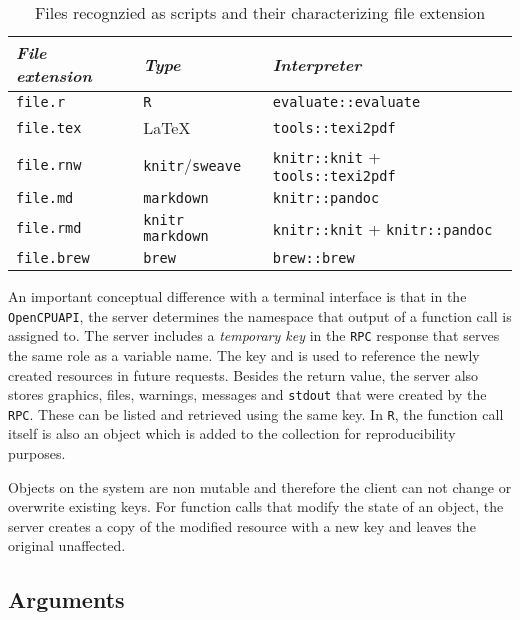 \documentclass{article}
\newcommand{\R}{\texttt{R}\xspace}
\newcommand{\API}{\texttt{API}\xspace}
\newcommand{\RPC}{\texttt{RPC}\xspace}
\newcommand{\OpenCPU}{\texttt{OpenCPU}\xspace}
\newcommand{\Latex}{\LaTeX \xspace}
\begin{document}
\begin{table}[H]
\centering
\def\arraystretch{1.3}%
\begin{tabular}{@{}lll@{}}
\toprule
\emph{File extension} & \emph{Type}           & \emph{Interpreter}                   \\ \midrule
\texttt{file.r}         & \R       & \texttt{evaluate::evaluate}            \\
\texttt{file.tex}       & \Latex          & \texttt{tools::texi2pdf}               \\
\texttt{file.rnw}       & \texttt{knitr}/\texttt{sweave}   & \texttt{knitr::knit} + \texttt{tools::texi2pdf} \\
\texttt{file.md}        & \texttt{markdown}       & \texttt{knitr::pandoc}                 \\
\texttt{file.rmd}       & \texttt{knitr markdown} & \texttt{knitr::knit} + \texttt{knitr::pandoc}   \\
\texttt{file.brew}      & \texttt{brew}           & \texttt{brew::brew}                    \\ \bottomrule
\end{tabular}
\caption{Files recognzied as scripts and their characterizing file extension}
\label{table:scripts}
\end{table}

An important conceptual difference with a terminal interface is that in the \OpenCPU \API, the server determines the namespace that output of a function call is assigned to. The server includes a \emph{temporary key} in the \RPC response that serves the same role as a variable name. The key and is used to reference the newly created resources in future requests. Besides the return value, the server also stores graphics, files, warnings, messages and \texttt{stdout} that were created by the \RPC. These can be listed and retrieved using the same key. In \R, the function call itself is also an object which is added to the collection for reproducibility purposes. 

Objects on the system are non mutable and therefore the client can not change or overwrite existing keys. For function calls that modify the state of an object, the server creates a copy of the modified resource with a new key and leaves the original unaffected.

\subsection{Arguments}
\end{document}

